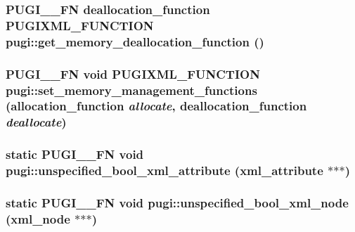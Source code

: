 \label{namespacepugi_ab36e5aed4e5c952687b42d69daf981eb}
\hypertarget{namespacepugi_a9fcabe4b52fbef0f133fab9ff97652ca}{
\subsubsection[{get\_\-memory\_\-deallocation\_\-function}]{\setlength{\rightskip}{0pt plus 5cm}PUGI\_\-\_\-FN deallocation\_\-function PUGIXML\_\-FUNCTION pugi::get\_\-memory\_\-deallocation\_\-function ()}}
\label{namespacepugi_a9fcabe4b52fbef0f133fab9ff97652ca}
\hypertarget{namespacepugi_a993c6b7947c1dec98936510d9e5fe778}{
\subsubsection[{set\_\-memory\_\-management\_\-functions}]{\setlength{\rightskip}{0pt plus 5cm}PUGI\_\-\_\-FN void PUGIXML\_\-FUNCTION pugi::set\_\-memory\_\-management\_\-functions (allocation\_\-function {\em allocate}, \/  deallocation\_\-function {\em deallocate})}}
\label{namespacepugi_a993c6b7947c1dec98936510d9e5fe778}
\hypertarget{namespacepugi_a8effe3a6fc7cc9c1cf2550739dbdc438}{
\subsubsection[{unspecified\_\-bool\_\-xml\_\-attribute}]{\setlength{\rightskip}{0pt plus 5cm}static PUGI\_\-\_\-FN void pugi::unspecified\_\-bool\_\-xml\_\-attribute (xml\_\-attribute $\ast$$\ast$$\ast$)}}
\label{namespacepugi_a8effe3a6fc7cc9c1cf2550739dbdc438}
\hypertarget{namespacepugi_a487b2e720a3808d6fd5730d7c97bcdac}{
\subsubsection[{unspecified\_\-bool\_\-xml\_\-node}]{\setlength{\rightskip}{0pt plus 5cm}static PUGI\_\-\_\-FN void pugi::unspecified\_\-bool\_\-xml\_\-node (xml\_\-node $\ast$$\ast$$\ast$)}}
